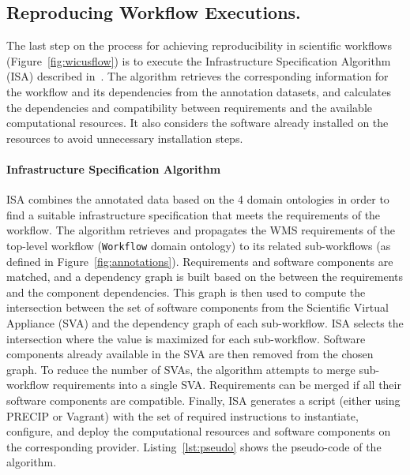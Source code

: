 \subsection{Reproducing Workflow Executions.}

The last step on the process for achieving reproducibility in scientific workflows 
(Figure~\ref{fig:wicusflow}) is to execute the Infrastructure Specification Algorithm 
(ISA) described in~\cite{wicus}. The algorithm retrieves the corresponding information for the 
workflow and its dependencies from the annotation datasets, and calculates the 
dependencies and compatibility between requirements and the available 
computational resources. It also considers the software already installed on the
resources to avoid unnecessary installation steps.

\paragraph{\textbf{Infrastructure Specification Algorithm}}
ISA combines the annotated data based on the 4 
domain ontologies in order to find a suitable infrastructure specification that meets 
the requirements of the workflow. The algorithm retrieves and propagates the WMS 
requirements of the top-level workflow (\texttt{Workflow} domain ontology) to its 
related sub-workflows (as defined in Figure~\ref{fig:annotations}). Requirements 
and software components are matched, and a dependency graph is built based 
on the  between the requirements and the component dependencies. This 
graph is then used to compute the intersection between the set of software components 
from the Scientific Virtual Appliance (SVA) and the dependency graph of each sub-workflow. ISA selects the 
intersection where the value is maximized for each sub-workflow. Software components 
already available in the SVA are then removed from the chosen graph. To reduce 
the number of SVAs, the algorithm attempts to merge sub-workflow requirements 
into a single SVA. Requirements can be merged if all their software components are 
compatible. Finally, ISA generates a script (either using PRECIP or Vagrant) with 
the set of required instructions to instantiate, configure, and deploy the computational 
resources and software components on the corresponding provider. Listing~\ref{lst:pseudo}
shows the pseudo-code of the algorithm.
          
